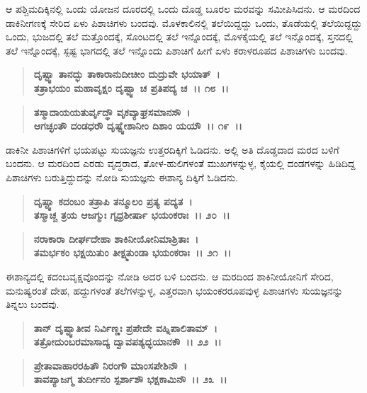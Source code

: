 ಆ ಪಶ್ಚಿಮದಿಕ್ಕಿನಲ್ಲಿ ಒಂದು ಯೋಜನ ದೂರದಲ್ಲಿ ಒಂದು ದೊಡ್ಡ ಬೂರಲ ಮರವನ್ನು ಸಮೀಪಿಸಿದನು. ಆ ಮರದಿಂದ ಡಾಕಿನೀಗಣಕ್ಕೆ ಸೇರಿದ ಏಳು ಪಿಶಾಚಿಗಳು ಬಂದವು. ಮೊಳಕಾಲಿನಲ್ಲಿ ತಲೆಯಿದ್ದದ್ದು ಒಂದು, ತೊಡೆಯಲ್ಲಿ ತಲೆಯಿದ್ದದ್ದು ಒಂದು, ಭುಜದಲ್ಲಿ ತಲೆ ಮತ್ತೊಂದಕ್ಕೆ, ಸೊಂಟದಲ್ಲಿ ತಲೆ ಇನ್ನೊಂದಕ್ಕೆ, ಮೊಳಕೈಯಲ್ಲಿ ತಲೆ ಇನ್ನೊಂದಕ್ಕೆ, ಸ್ತನದಲ್ಲಿ ತಲೆ ಇನ್ನೊಂದಕ್ಕೆ, ಸ್ಪಷ್ಟ ಭಾಗದಲ್ಲಿ ತಲೆ ಇನ್ನೊಂದು ಪಿಶಾಚಿಗೆ ಹೀಗೆ ಏಳು ಕರಾಳರೂಪದ ಪಿಶಾಚಿಗಳು ಬಂದವು.

\begin{verse}
\textbf{ದೃಷ್ಟ್ವಾ ತಾನದ್ಭು ತಾಕಾರಾನುದೀಚೀಂ ದುದ್ರುವೇ ಭಯಾತ್~।}\\\textbf{ತತ್ರಾಭಯಂ ಮಹಾವೃಕ್ಷಂ ದೃಷ್ಟ್ವಾ ಚ ಪ್ರತಿಪದ್ಯ ಚ~।। ೧೮~।।} 
\end{verse}

\begin{verse}
\textbf{ತಸ್ಮಾದಾಯಯತುರ್ವೃದ್ಧೌ ವೃಕವ್ಯಾಘ್ರಸಮಾನಸೌ~।}\\\textbf{ಆಗಚ್ಛಂತೌ ದಂಡಧರೌ ದೃಷ್ಟ್ವೇಶಾನೀಂ ದಿಶಾಂ ಯಯೌ~।। ೧೯~।।}
\end{verse}

ಡಾಕಿನೀ ಪಿಶಾಚಿಗಳಿಗೆ ಭಯಪಟ್ಟು ಸುಯಜ್ಞನು ಉತ್ತರದಿಕ್ಕಿಗೆ ಓಡಿದನು. ಅಲ್ಲಿ ಅತಿ ದೊಡ್ಡದಾದ ಮರದ ಬಳಿಗೆ ಬಂದನು. ಆ ಮರದಿಂದ ಎರಡು ವೃದ್ಧರಾದ, ತೋಳ-\-ಹುಲಿಗಳಂತೆ ಮುಖಗಳನ್ನುಳ್ಳ, ಕೈಯಲ್ಲಿ ದಂಡಗಳನ್ನು ಹಿಡಿದಿದ್ದ ಪಿಶಾಚಿಗಳು ಬರುತ್ತಿದ್ದುದನ್ನು ನೋಡಿ ಸುಯಜ್ಞನು ಈಶಾನ್ಯ ದಿಕ್ಕಿಗೆ ಓಡಿದನು.

\begin{verse}
\textbf{ದೃಷ್ಟ್ವಾ ಕದಂಬಂ ತತ್ರಾಪಿ ತನ್ಮೂಲಂ ಪ್ರತ್ಯ ಪದ್ಯತ~।}\\\textbf{ತಸ್ಮಾಚ್ಚ ತ್ರಯ ಆಜಗ್ಮುಃ ಗೃಧ್ರಶೀರ್ಷಾ ಭಯಂಕರಾಃ~।। ೨೦~।। }
\end{verse}

\begin{verse}
\textbf{ನರಾಕಾರಾ ದೀರ್ಘದೇಹಾ ಶಾಕಿನೀಯೋನಿಮಾಶ್ರಿತಾಃ~।}\\\textbf{ತಮರ್ಭಕಂ ಭಕ್ಷಯಿತುಂ ತೀಕ್ಷ್ಮತುಂಡಾ ಭಯಂಕರಾಃ~।। ೨೧~।।}
\end{verse}

ಈಶಾನ್ಯದಲ್ಲಿ ಕದಂಬವೃಕ್ಷವೊಂದನ್ನು ನೋಡಿ ಅದರ ಬಳಿ ಬಂದನು. ಆ ಮರದಿಂದ ಶಾಕಿನೀಯೋನಿಗೆ ಸೇರಿದ, ಮನುಷ್ಯರಂತೆ ದೇಹ, ಹದ್ದುಗಳಂತೆ ತಲೆಗಳನ್ನುಳ್ಳ, ಎತ್ತರವಾಗಿ ಭಯಂಕರರೂಪವುಳ್ಳ ಪಿಶಾಚಿಗಳು ಸುಯಜ್ಞನನ್ನು ತಿನ್ನಲು ಬಂದವು.

\begin{verse}
\textbf{ತಾನ್ ದೃಷ್ಟ್ವಾತೀವ ನಿರ್ವಿಣ್ಣಃ ಪ್ರಪೇದೇ ವಹ್ನಿಪಾಲಿತಾಮ್~।}\\\textbf{ತತ್ರೋದುಂಬರಮಾಸಾದ್ಯ ದ್ವಾವಪಶ್ಯದ್ಭಯಾನಕೌ~।। ೨೨~।। }
\end{verse}

\begin{verse}
\textbf{ಪ್ರೇತಾವಾಹಾರರಹಿತೌ ನಿರಂಗೌ ಮಾಂಸಪೇಶಿನೌ~।}\\\textbf{ತಾವಪ್ಯಾಜಗ್ಮ ತುರ್ದೀನಂ ಸ್ಪರ್ಶಾಶೌ ಭಕ್ಷಕಾಮಿನೌ~।। ೨೩~।।}
\end{verse}

